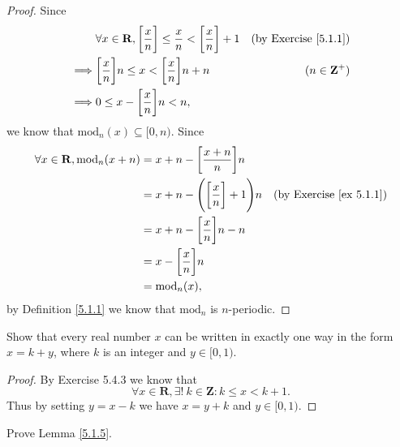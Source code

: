 \begin{proof}
    Since
    \begin{align*}
                 & \forall x \in \mathbf{R}, \bigg[\frac{x}{n}\bigg] \leq \frac{x}{n} < \bigg[\frac{x}{n}\bigg] + 1 & \text{(by Exercise \ref{5.1.1})} \\
        \implies & \bigg[\frac{x}{n}\bigg] n \leq x < \bigg[\frac{x}{n}\bigg] n + n                                 & (n \in \mathbf{Z}^+)             \\
        \implies & 0 \leq x - \bigg[\frac{x}{n}\bigg] n < n,
    \end{align*}
    we know that \(\text{mod}_n(x) \subseteq [0, n)\).
    Since
    \begin{align*}
        \forall x \in \mathbf{R}, \text{mod}_n(x + n) & = x + n - \bigg[\frac{x + n}{n}\bigg] n                                                   \\
                                                      & = x + n - \Bigg(\bigg[\frac{x}{n}\bigg] + 1\Bigg) n & \text{(by Exercise \ref{ex 5.1.1})} \\
                                                      & = x + n - \bigg[\frac{x}{n}\bigg] n - n                                                   \\
                                                      & = x - \bigg[\frac{x}{n}\bigg] n                                                           \\
                                                      & = \text{mod}_n(x),
    \end{align*}
    by Definition \ref{5.1.1} we know that \(\text{mod}_n\) is \(n\)-periodic.
\end{proof}

\exercisesection

\begin{exercise}\label{ex 5.1.1}
    Show that every real number \(x\) can be written in exactly one way in the form \(x = k + y\), where \(k\) is an integer and \(y \in [0, 1)\).
\end{exercise}

\begin{proof}
    By Exercise 5.4.3 we know that
    \[
        \forall x \in \mathbf{R}, \exists!\ k \in \mathbf{Z} : k \leq x < k + 1.
    \]
    Thus by setting \(y = x - k\) we have \(x = y + k\) and \(y \in [0, 1)\).
\end{proof}

\begin{exercise}\label{ex 5.1.2}
    Prove Lemma \ref{5.1.5}.
\end{exercise}

